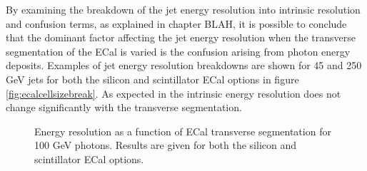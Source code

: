 By examining the breakdown of the jet energy resolution into intrinsic resolution and confusion terms, as explained in chapter BLAH, it is possible to conclude that the dominant factor affecting the jet energy resolution when the transverse segmentation of the ECal is varied is the confusion arising from photon energy deposits.  Examples of jet energy resolution breakdowns are shown for 45 and 250 GeV jets for both the silicon and scintillator ECal options in figure \ref{fig:ecalcellsizebreak}.  As expected in the intrinsic energy resolution does not change significantly with the transverse segmentation.  

\begin{figure}
\centering
\caption[Energy resolution as a function of ECal transverse segmentation for 100 GeV photons.  Results are given for both the silicon and scintillator ECal options.]{Energy resolution as a function of ECal transverse segmentation for 100 GeV photons.  Results are given for both the silicon and scintillator ECal options.}
\label{fig:ecalcellsizegamma}
\end{figure}

